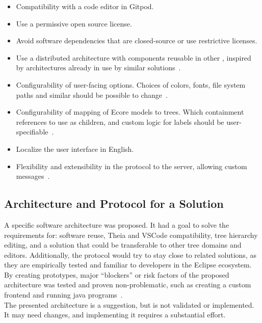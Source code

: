 \begin{itemize}
  \item Compatibility with a code editor in \gls{Gitpod}.
  \item Use a permissive \gls{open source} license.
  \item Avoid software dependencies that are closed-source or use restrictive licenses.
  \item Use a distributed architecture with components reusable in other , inspired by architectures already in use by similar solutions~\cite[p.~24]{rekstadModelingEnvironmentCloud2020}.
  \item Configurability of user-facing options. Choices of colors, fonts, file system paths and similar should be possible to change~\cite[p.~24]{rekstadModelingEnvironmentCloud2020}.
  \item Configurability of mapping of \gls{Ecore} models to trees. Which containment references to use as children, and custom logic for labels should be user-specifiable~\cite[p.~24]{rekstadModelingEnvironmentCloud2020}.
  \item Localize the user interface in English.
  \item Flexibility and extensibility in the protocol to the server, allowing custom messages~\cite[p.~24]{rekstadModelingEnvironmentCloud2020}.
\end{itemize}


\subsection{Architecture and Protocol for a Solution}\label{subsec:pre-project-protocol}

A specific software architecture was proposed.
It had a goal to solve the requirements for: software reuse, \gls{Theia} and \gls{VSCode} compatibility, tree hierarchy editing, and a solution that could be transferable to other tree domains and editors.
Additionally, the protocol would try to stay close to related solutions, as they are empirically tested and familiar to developers in the Eclipse ecosystem.
By creating prototypes, major ``blockers'' or risk factors of the proposed architecture was tested and proven non-problematic, such as creating a custom frontend and running java programs~\cite[p.~38-46]{rekstadModelingEnvironmentCloud2020}.\\

The presented architecture is a suggestion, but is not validated or implemented.
It may need changes, and implementing it requires a substantial effort.

